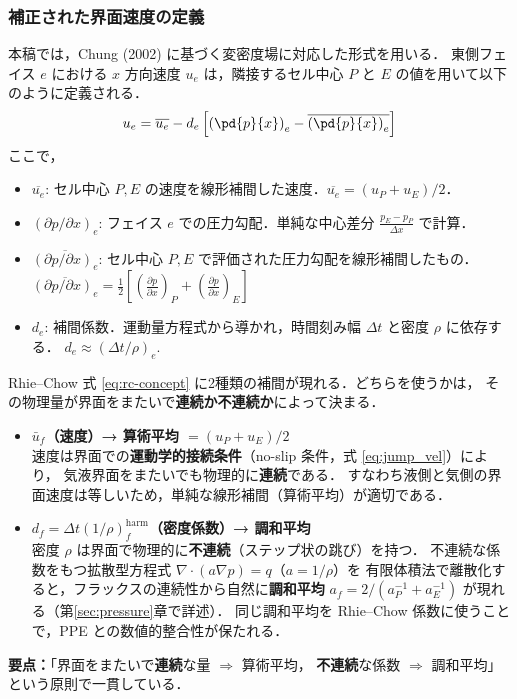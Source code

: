 \subsubsection{補正された界面速度の定義}
本稿では，Chung (2002) に基づく変密度場に対応した形式を用いる．
東側フェイス $e$ における $x$ 方向速度 $u_e$ は，隣接するセル中心 $P$ と $E$ の値を用いて以下のように定義される．
\begin{equation}
 u_e = \overline{u_e} - d_e \left[ \left(\pd{p}{x}\right)_e - \overline{\left(\pd{p}{x}\right)_e} \right]
 \label{eq:rc-concept}
\end{equation}
ここで，
\begin{itemize}
    \item $\overline{u_e}$: セル中心 $P, E$ の速度を線形補間した速度．$\overline{u_e} = (u_P+u_E)/2$．
    \item $(\partial p/\partial x)_e$: フェイス $e$ での圧力勾配．単純な中心差分 $\frac{p_E-p_P}{\Delta x}$ で計算．
    \item $\overline{(\partial p/\partial x)_e}$: セル中心 $P, E$ で評価された圧力勾配を線形補間したもの．
    $\overline{(\partial p/\partial x)_e} = \frac{1}{2}\left[ \left(\frac{\partial p}{\partial x}\right)_P + \left(\frac{\partial p}{\partial x}\right)_E \right]$
    \item $d_e$: 補間係数．運動量方程式から導かれ，時間刻み幅 $\Delta t$ と密度 $\rho$ に依存する．
    $d_e \approx (\Delta t / \rho)_e$.
\end{itemize}

\begin{tcolorbox}[defbox, title={算術平均と調和平均：物理的連続性による使い分け}]
Rhie--Chow 式 \eqref{eq:rc-concept} に2種類の補間が現れる．どちらを使うかは，
その物理量が界面をまたいで\textbf{連続か不連続か}によって決まる．

\begin{itemize}
  \item \textbf{$\bar{u}_f$（速度）→ 算術平均 $= (u_P + u_E)/2$}\\
    速度は界面での\textbf{運動学的接続条件}（no-slip 条件，式 \eqref{eq:jump_vel}）により，
    気液界面をまたいでも物理的に\textbf{連続}である．
    すなわち液側と気側の界面速度は等しいため，単純な線形補間（算術平均）が適切である．

  \item \textbf{$d_f = \Delta t (1/\rho)_f^{\mathrm{harm}}$（密度係数）→ 調和平均}\\
    密度 $\rho$ は界面で物理的に\textbf{不連続}（ステップ状の跳び）を持つ．
    不連続な係数をもつ拡散型方程式 $\nabla\cdot(a\nabla p) = q$（$a = 1/\rho$）を
    有限体積法で離散化すると，フラックスの連続性から自然に\textbf{調和平均}
    $a_f = 2/(a_P^{-1}+a_E^{-1})$ が現れる（第\ref{sec:pressure}章で詳述）．
    同じ調和平均を Rhie--Chow 係数に使うことで，PPE との数値的整合性が保たれる．
\end{itemize}

\textbf{要点：}「界面をまたいで\textbf{連続}な量 $\Rightarrow$ 算術平均，
\textbf{不連続}な係数 $\Rightarrow$ 調和平均」という原則で一貫している．
\end{tcolorbox}

